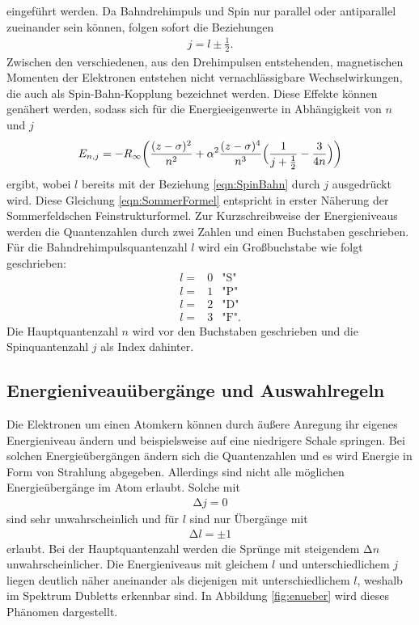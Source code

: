 eingeführt werden. Da Bahndrehimpuls und Spin nur parallel oder antiparallel
zueinander sein können, folgen sofort die Beziehungen
\begin{align}
  j = l \pm \frac{1}{2}.
  \label{eqn:SpinBahn}
\end{align}
Zwischen den verschiedenen, aus den Drehimpulsen entstehenden, magnetischen
Momenten der Elektronen entstehen nicht vernachlässigbare Wechselwirkungen, die
auch als Spin-Bahn-Kopplung bezeichnet werden.
Diese Effekte können genähert werden, sodass sich für die Energieeigenwerte
in Abhängigkeit von $n$ und $j$
\begin{align}
  E_{n,j} = -R_\infty \biggl(\frac{(z-\sigma)^2}{n^2} + \alpha^2 \frac{(z-\sigma)^4}{n^3}
  \Bigl(\frac{1}{j+\frac{1}{2}} - \frac{3}{4n}\Bigr)\biggr)
  \label{eqn:SommerFormel}
\end{align}
ergibt, wobei $l$ bereits mit der Beziehung \eqref{eqn:SpinBahn} durch $j$
ausgedrückt wird.
Diese Gleichung \eqref{eqn:SommerFormel} entspricht in erster Näherung der
Sommerfeldschen Feinstrukturformel.
Zur Kurzschreibweise der Energieniveaus werden die Quantenzahlen durch zwei
Zahlen und einen Buchstaben geschrieben.
Für die Bahndrehimpulsquantenzahl $l$ wird ein Großbuchstabe wie folgt
geschrieben:
\begin{align}
  l = & 0 & \text{"S"} \\
  l = & 1 & \text{"P"} \\
  l = & 2 & \text{"D"} \\
  l = & 3 & \text{"F"}.
\end{align}
Die Hauptquantenzahl $n$ wird vor den Buchstaben geschrieben und die
Spinquantenzahl $j$ als Index dahinter.

\subsection{Energieniveauübergänge und Auswahlregeln}

Die Elektronen um einen Atomkern können durch äußere Anregung ihr eigenes
Energieniveau ändern und beispielsweise auf eine niedrigere Schale springen.
Bei solchen Energieübergängen ändern sich die Quantenzahlen und es wird
Energie in Form von Strahlung abgegeben. Allerdings sind nicht alle möglichen
Energieübergänge im Atom erlaubt. Solche mit
\begin{align}
  \increment j = 0
\end{align}
sind sehr unwahrscheinlich und für $l$ sind nur Übergänge mit
\begin{align}
  \increment l = \pm 1
\end{align}
erlaubt. Bei der Hauptquantenzahl werden die Sprünge mit steigendem
$\increment n$ unwahrscheinlicher.
Die Energieniveaus mit gleichem $l$ und unterschiedlichem $j$ liegen
deutlich näher aneinander als diejenigen mit unterschiedlichem $l$, weshalb
im Spektrum Dubletts erkennbar sind. In Abbildung \ref{fig:enueber} wird dieses
Phänomen dargestellt.


